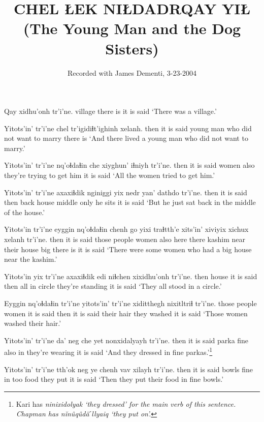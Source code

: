 \documentclass[12pt]{article}
\begin{document}
\title{CHEL ŁEK NIŁDADRQAY YIŁ
\\(The Young Man and the Dog Sisters)}

\author{Recorded with James Dementi, 3-23-2004}
\date{}

\maketitle

\gll Qay xidhu'onh tr'i'ne.
village {there is} {it is said} 
\glt `There was a village.'
\glend

\gll Yitots'in' tr'i'ne chel tr'igidiɬt'ighinh  xelanh.
then  {it is said} {young man} {who did not want to marry} {there is}
\glt `And there lived a young man who did not want to marry.'
\glend

\gll Yitots'in' tr'i'ne nq'oɬdaɬin che {xiyghun' iɬniyh} tr'i'ne.
then  {it is said} women also {they're trying to get him} {it is said}
\glt `All the women tried to get him.'
\glend

\gll Yitots'in' tr'i'ne axaxiɬdik nginiggi yix nedr yan' dathdo tr'i'ne.
then  {it is said} then  back  house middle only {he sits} {it is said}
\glt `But he just sat back in the middle of the house.'
\glend

\gll Yitots'in tr'i'ne eyggin nq'oɬdaɬin chenh go yixi traɬtth'e xits'in' xiviyix xichux xelanh tr'i'ne.
then  {it is said} {those people}  women  also here there kashim  near {their house} big {there is} {it is said}
\glt `There were some women who had a big house near the kashim.'
\glend

\gll Yitots'in yix tr'i'ne axaxiɬdik edi niɬchen xixidhu'onh tr'i'ne.
then  house {it is said} then all {in circle} {they're standing} {it is said}
\glt `They all stood in a circle.'
\glend

\gll Eyggin nq'oɬdaɬin  tr'i'ne yitots'in' tr'i'ne xiditthegh nixitltriɬ tr'i'ne.
{those people} women  {it is said} then  {it is said} {their hair} {they washed} {it is said}
\glt `Those women washed their hair.'
\glend

\gll Yitots'in' tr'i'ne da' neg che yet  nonxidalyayh tr'i'ne.
then  {it is said} parka fine also in  {they're wearing} {it is said}
\glt `And they dressed in fine parkas.'\footnote{Kari has \em ninixidolyak \em `they dressed' for the main verb of this sentence. Chapman has \em n\u{i}n\^uq\^ud\"aˊllyaiq \em `they put on'.}
\glend

\gll Yitots'in' tr'i'ne tth'ok neg ye chenh vav xilayh tr'i'ne.
then  {it is said} bowls fine in too food {they put} {it is said}
\glt `Then they put their food in fine bowls.'
\glend
\end{document}
